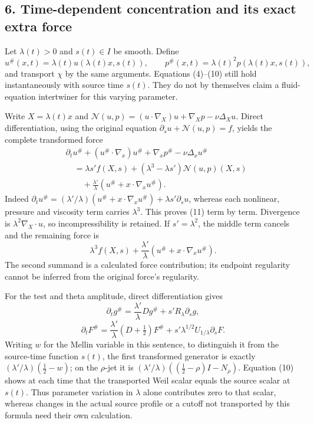 \subsection{6. Time-dependent concentration and its exact extra
force}\label{proof09:time-dependent-concentration-and-its-exact-extra-force}

Let \(\lambda(t)>0\) and \(s(t)\in I\) be smooth. Define \[
u^\#(x,t)=\lambda(t)u(\lambda(t)x,s(t)),\qquad
p^\#(x,t)=\lambda(t)^2p(\lambda(t)x,s(t)),
\] and transport \(\chi\) by the same arguments. Equations (4)--(10)
still hold instantaneously with source time \(s(t)\). They do not by
themselves claim a fluid-equation intertwiner for this varying
parameter.

Write \(X=\lambda(t)x\) and
\(\mathcal N(u,p)= (u\cdot\nabla_X)u+\nabla_Xp-\nu\Delta_Xu\). Direct
differentiation, using the original equation
\(\partial_su+\mathcal N(u,p)=f\), yields the complete transformed force
\[
\boxed{\begin{aligned}
&\partial_tu^\#+(u^\#\cdot\nabla_x)u^\#+\nabla_xp^\#-\nu\Delta_xu^\#\\
&\quad=\lambda s'f(X,s)+(\lambda^3-\lambda s')\mathcal N(u,p)(X,s)\\
&\qquad+\frac{\lambda'}{\lambda}(u^\#+x\cdot\nabla_xu^\#).
\end{aligned}}
\tag{11}
\] Indeed
\(\partial_tu^\#=(\lambda'/\lambda)(u^\#+x\cdot\nabla_xu^\#)+\lambda s'\partial_su\),
whereas each nonlinear, pressure and viscosity term carries
\(\lambda^3\). This proves (11) term by term. Divergence is
\(\lambda^2\nabla_X\cdot u\), so incompressibility is retained. If
\(s'=\lambda^2\), the middle term cancels and the remaining force is \[
\lambda^3 f(X,s)+\frac{\lambda'}{\lambda}(u^\#+x\cdot\nabla_xu^\#).
\tag{12}
\] The second summand is a calculated force contribution; its endpoint
regularity cannot be inferred from the original force's regularity.

For the test and theta amplitude, direct differentiation gives \[
\partial_tg^\#=\frac{\lambda'}{\lambda}Dg^\#+s'R_\lambda\partial_sg,
\] \[
\partial_tF^\#=\frac{\lambda'}{\lambda}(D+\tfrac12)F^\#+s'\lambda^{1/2}U_{1/\lambda}\partial_sF.
\tag{13}
\] Writing \(w\) for the Mellin variable in this sentence, to
distinguish it from the source-time function \(s(t)\), the first
transformed generator is exactly \((\lambda'/\lambda)(\tfrac12-w)\); on
the \(\rho\)-jet it is \((\lambda'/\lambda)((\tfrac12-\rho)I-N_\rho)\).
Equation (10) shows at each time that the transported Weil scalar equals
the source scalar at \(s(t)\). Thus parameter variation in \(\lambda\)
alone contributes zero to that scalar, whereas changes in the actual
source profile or a cutoff not transported by this formula need their
own calculation.

